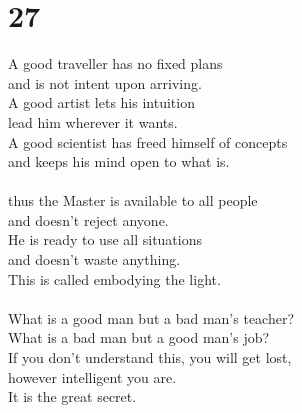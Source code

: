 \documentclass[b5paper, 12pt, oneside]{book}
\begin{document}
\chapter*{27}
A good traveller has no fixed plans\\
and is not intent upon arriving.\\
A good artist lets his intuition\\
lead him wherever it wants.\\
A good scientist has freed himself of concepts\\
and keeps his mind open to what is.\\
\\
thus the Master is available to all people\\
and doesn't reject anyone.\\
He is ready to use all situations\\
and doesn't waste anything.\\
This is called embodying the light.\\
\\
What is a good man but a bad man's teacher?\\
What is a bad man but a good man's job?\\
If you don't understand this, you will get lost,\\
however intelligent you are.\\
It is the great secret.\\
\end{document}

